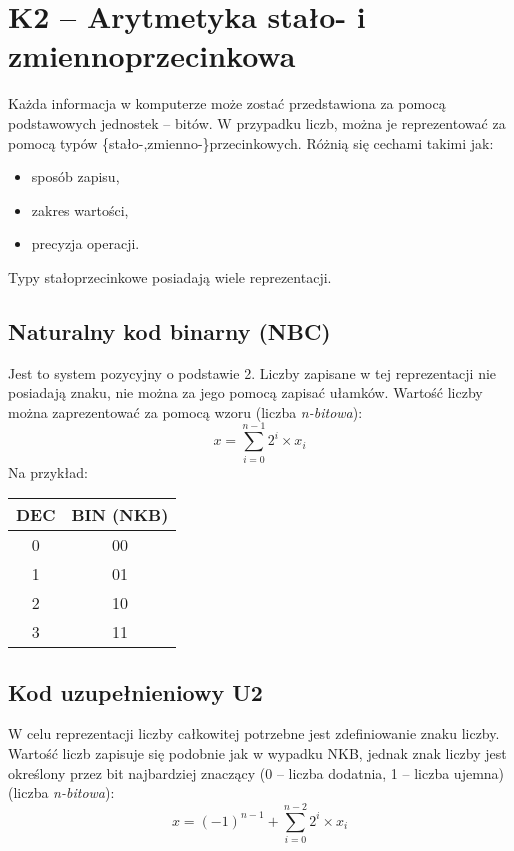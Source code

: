 \sloppy\section{K2 -- Arytmetyka stało- i zmiennoprzecinkowa}

Każda informacja w komputerze może zostać przedstawiona za pomocą podstawowych jednostek -- bitów. W przypadku liczb, można je reprezentować za pomocą typów \{stało-,zmienno-\}przecinkowych. Różnią się cechami takimi jak:
\begin{itemize}
\item sposób zapisu,
\item zakres wartości,
\item precyzja operacji.
\end{itemize}

Typy stałoprzecinkowe posiadają wiele reprezentacji. 

\subsection{Naturalny kod binarny (NBC)}
Jest to system pozycyjny o podstawie 2. Liczby zapisane w tej reprezentacji nie posiadają znaku, nie można za jego pomocą zapisać ułamków. Wartość liczby można zaprezentować za pomocą wzoru (liczba \textit{n-bitowa}):
\begin{equation}
x = \sum_{i=0}^{n-1}2^{i} \times x_{i}
\end{equation}
Na przykład:
\begin{table}[H]
\centering
\begin{tabular}{|c|c|} \hline
DEC	&	BIN (NKB)	\\ \hline
0	&	00	\\ \hline
1	&	01	\\ \hline
2	&	10	\\ \hline
3	&	11	\\ \hline
\end{tabular}
\end{table}

\subsection{Kod uzupełnieniowy U2}
W celu reprezentacji liczby całkowitej potrzebne jest zdefiniowanie znaku liczby. Wartość liczb zapisuje się podobnie jak w wypadku NKB, jednak znak liczby jest określony przez bit najbardziej znaczący (0 -- liczba dodatnia, 1 -- liczba ujemna) (liczba \textit{n-bitowa}):
\begin{equation}
x = (-1)^{n-1}+\sum_{i=0}^{n-2}2^{i} \times x_{i}
\end{equation}

